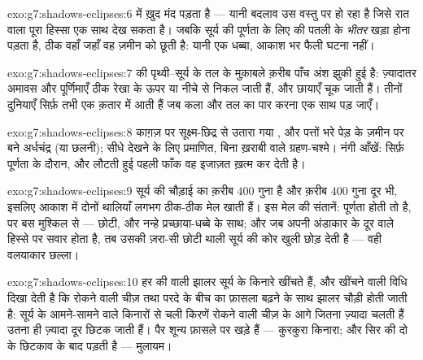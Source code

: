 \begin{solution}{exo:g7:shadows-eclipses:6}
 में ख़ुद  मंद पड़ता है --- यानी बदलाव उस वस्तु पर हो
रहा है जिसे रात वाला पूरा हिस्सा एक साथ देख सकता है। जबकि सूर्य की
पूर्णता के लिए  की पतली  के \emph{भीतर} खड़ा होना
पड़ता है, ठीक वहाँ जहाँ वह ज़मीन को छूती है: यानी एक धब्बा, आकाश भर
फैली घटना नहीं।
\end{solution}

\begin{solution}{exo:g7:shadows-eclipses:7}
 की  पृथ्वी--सूर्य के तल के मुक़ाबले क़रीब पाँच अंश झुकी
हुई है: ज़्यादातर अमावस और पूर्णिमाएँ ठीक रेखा के ऊपर या नीचे से निकल
जाती हैं, और छायाएँ चूक जाती हैं। तीनों दुनियाएँ सिर्फ़ तभी एक क़तार
में आती हैं जब कला और तल का पार करना एक साथ पड़ जाएँ।
\end{solution}

\begin{solution}{exo:g7:shadows-eclipses:8}
काग़ज़ पर सूक्ष्म-छिद्र से उतारा गया , और पत्तों भरे पेड़ के
ज़मीन पर बने अर्धचंद्र (या छलनी); सीधे देखने के लिए प्रमाणित, बिना
ख़राबी वाले ग्रहण-चश्मे। नंगी आँखें: सिर्फ़ पूर्णता के दौरान, और
लौटती हुई पहली फाँक वह इजाज़त ख़त्म कर देती है।
\end{solution}

\begin{solution}{exo:g7:shadows-eclipses:9}
सूर्य  की चौड़ाई का क़रीब $400$ गुना है और क़रीब $400$ गुना दूर
भी, इसलिए आकाश में दोनों थालियाँ लगभग ठीक-ठीक मेल खाती हैं। इस मेल की
संतानें: पूर्णता होती तो है, पर बस मुश्किल से --- छोटी, और नन्हे
प्रच्छाया-धब्बे के साथ; और जब  अपनी अंडाकार  के दूर वाले
हिस्से पर सवार होता है, तब उसकी ज़रा-सी छोटी थाली सूर्य की कोर खुली
छोड़ देती है --- वही वलयाकार छल्ला।
\end{solution}

\begin{solution}{exo:g7:shadows-eclipses:10}
हर  की  वाली झालर सूर्य के किनारे खींचते हैं, और खींचने
वाली विधि दिखा देती है कि रोकने वाली चीज़ तथा परदे के बीच का फ़ासला
बढ़ने के साथ झालर चौड़ी होती जाती है: सूर्य के आमने-सामने वाले किनारों
से चली किरणें रोकने वाली चीज़ के आगे जितना ज़्यादा चलती हैं उतना ही
ज़्यादा दूर छिटक जाती हैं। पैर शून्य फ़ासले पर खड़े हैं --- कुरकुरा
किनारा; और सिर की  दो  के छिटकाव के बाद पड़ती है --- मुलायम।
\end{solution}

